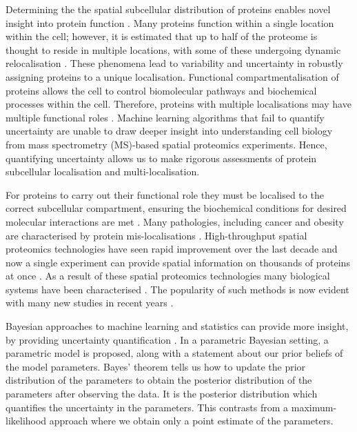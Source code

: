 \documentclass[9pt,a4paper,]{extarticle}
\begin{document}
Determining the the spatial subcellular distribution of
proteins enables novel insight into protein function
\citep{Crook:2018}. Many proteins function within a single location within the
cell; however, it is estimated that up to half of the proteome is thought to
reside in multiple locations, with some of these undergoing
dynamic relocalisation \citep{Thul:2017}. These phenomena lead
to variability and uncertainty in robustly assigning proteins to a unique
localisation. Functional
compartmentalisation of proteins allows the cell to control
biomolecular pathways and biochemical processes within the
cell. Therefore, proteins with multiple localisations may have multiple
functional roles \citep{Jeffery:2009}. Machine learning algorithms that
fail to quantify uncertainty are unable to draw deeper insight into
understanding cell biology from mass spectrometry (MS)-based spatial
proteomics experiments. Hence, quantifying uncertainty allows us to
make rigorous assessments of protein subcellular localisation
and multi-localisation.

For proteins to carry out their functional role they must be localised
to the correct subcellular compartment, ensuring the biochemical conditions
for desired molecular interactions are met \citep{Gibson:2009}. Many
pathologies, including cancer and obesity are characterised by protein
mis-localisations \citep{Olkkonen:2006, Laurila:2009, Luheshi:2008, De:2011, Cody:2013, Kau:2004, Rodriguez:2004, Latorre:2005, Shin:2013, Siljee:2018}.
High-throughput spatial proteomics technologies have seen rapid improvement
over the last decade and now a single experiment can provide spatial information on
thousands of proteins at once \citep{Dunkley:2006, Foster:2006, hyper, DC:2018}.
As a result of these spatial proteomics technologies many biological systems have
been characterised \citep{Dunkley:2006, Tan:2009, Hall:2009, Breckels:2013, hyper, Thul:2017}.
The popularity of such methods is now evident with many new studies in recent years
\citep{hyper, Beltran:2016, Jadot:2017, Itzhak:2017, Mendes:2017, Hirst:2018, Davies:2018, Orre:2019, Nightingale:2019}.

Bayesian approaches to machine learning and statistics can
provide more insight, by providing uncertainty quantification
\citep{Gelman:1995}. In a parametric Bayesian setting, a parametric model
is proposed, along with a statement about our prior beliefs
of the model parameters. Bayes' theorem tells us how to update the
prior distribution of the parameters to obtain the posterior
distribution of the parameters after observing the data. It is the
posterior distribution which quantifies the uncertainty in the
parameters. This contrasts from a maximum-likelihood approach where we obtain only a
point estimate of the parameters.
\end{document}
